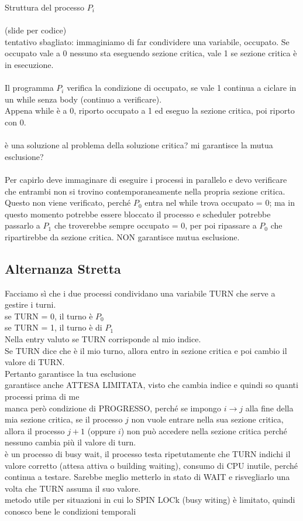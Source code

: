 \documentclass{article}
\begin{document}
Struttura del processo $P_i$ \\
\\
 (slide per codice)
 \\
 tentativo sbagliato: immaginiamo di far condividere una variabile, occupato. Se occupato vale a 0 nessuno sta eseguendo sezione critica, vale 1 se sezione critica è in esecuzione.\\
 \\
 Il programma $P_i$ verifica la condizione di occupato, se vale 1 continua a ciclare in un while senza body (continuo a verificare).\\
 Appena while è a 0, riporto occupato a 1 ed eseguo la sezione critica, poi riporto con 0.\\
 \\
 è una soluzione al problema della soluzione critica? mi garantisce la mutua esclusione?\\
 \\
 Per capirlo deve immaginare di eseguire i processi in parallelo e devo verificare che entrambi non si trovino contemporaneamente nella propria sezione critica.
 \\
 Questo non viene verificato, perché $P_0$ entra nel while trova occupato = 0; ma in questo momento potrebbe essere bloccato il processo e scheduler potrebbe passarlo a $P_1$ che troverebbe sempre occupato = 0, per poi ripassare a $P_0$ che ripartirebbe da sezione critica. NON garantisce mutua esclusione.\\
\subsection{Alternanza Stretta}
Facciamo sì che i due processi condividano una variabile TURN che serve a gestire i turni.\\
se TURN = 0, il turno è $P_0$\\
se TURN = 1, il turno è di $P_1$\\
Nella entry valuto se TURN corrisponde al mio indice.\\
Se TURN dice che è il mio turno, allora entro in sezione critica e poi cambio il valore di TURN. \\
Pertanto garantisce la tua esclusione \\
garantisce anche ATTESA LIMITATA, visto che cambia indice e quindi so quanti processi prima di me\\
manca però condizione di PROGRESSO, perché se impongo $i \rightarrow j$ alla fine della mia sezione critica, se il processo $j$ non vuole entrare nella sua sezione critica, allora il processo $j+1$ (oppure $i$) non può accedere nella sezione critica perché nessuno cambia più il valore di turn. \\
è un processo di busy wait, il processo testa ripetutamente che TURN indichi il valore corretto (attesa attiva o building waiting), consumo di CPU inutile, perché continua a testare. Sarebbe meglio metterlo in stato di WAIT e risvegliarlo una volta che TURN assuma il suo valore.\\
metodo utile per situazioni in cui lo SPIN LOCk (busy witing) è limitato, quindi conosco bene le condizioni temporali
\end{document}
